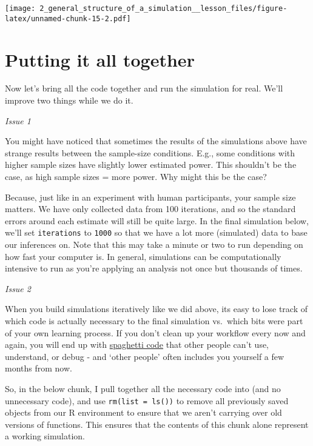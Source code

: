 \documentclass[
]{article}
\begin{document}
\texttt{[image: 2\_general\_structure\_of\_a\_simulation\_\_lesson\_files/figure-latex/unnamed-chunk-15-2.pdf]}

\hypertarget{putting-it-all-together}{%
\section{Putting it all together}\label{putting-it-all-together}}

Now let's bring all the code together and run the simulation for real.
We'll improve two things while we do it.

\emph{Issue 1}

You might have noticed that sometimes the results of the simulations
above have strange results between the sample-size conditions. E.g.,
some conditions with higher sample sizes have slightly lower estimated
power. This shouldn't be the case, as high sample sizes = more power.
Why might this be the case?

Because, just like in an experiment with human participants, your sample
size matters. We have only collected data from 100 iterations, and so
the standard errors around each estimate will still be quite large. In
the final simulation below, we'll set \texttt{iterations} to
\texttt{1000} so that we have a lot more (simulated) data to base our
inferences on. Note that this may take a minute or two to run depending
on how fast your computer is. In general, simulations can be
computationally intensive to run as you're applying an analysis not once
but thousands of times.

\emph{Issue 2}

When you build simulations iteratively like we did above, its easy to
lose track of which code is actually necessary to the final simulation
vs.~which bits were part of your own learning process. If you don't
clean up your workflow every now and again, you will end up with
\href{https://en.wikipedia.org/wiki/Spaghetti_code}{spaghetti code} that
other people can't use, understand, or debug - and `other people' often
includes you yourself a few months from now.

So, in the below chunk, I pull together all the necessary code into (and
no unnecessary code), and use \texttt{rm(list\ =\ ls())} to remove all
previously saved objects from our R environment to ensure that we aren't
carrying over old versions of functions. This ensures that the contents
of this chunk alone represent a working simulation.
\end{document}
